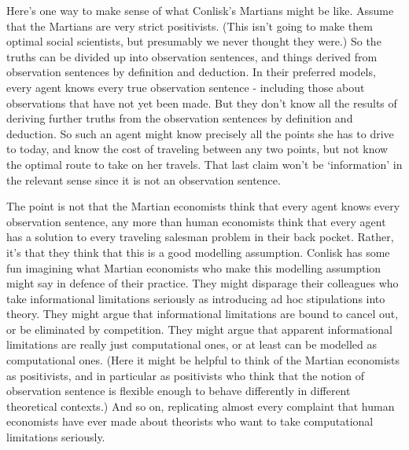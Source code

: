 \documentclass[
  10pt,
  letterpaper,
  twoside]{scrbook}
\begin{document}
Here's one way to make sense of what Conlisk's Martians might be like.
Assume that the Martians are very strict positivists. (This isn't going
to make them optimal social scientists, but presumably we never thought
they were.) So the truths can be divided up into observation sentences,
and things derived from observation sentences by definition and
deduction. In their preferred models, every agent knows every true
observation sentence - including those about observations that have not
yet been made. But they don't know all the results of deriving further
truths from the observation sentences by definition and deduction. So
such an agent might know precisely all the points she has to drive to
today, and know the cost of traveling between any two points, but not
know the optimal route to take on her travels. That last claim won't be
`information' in the relevant sense since it is not an observation
sentence.

The point is not that the Martian economists think that every agent
knows every observation sentence, any more than human economists think
that every agent has a solution to every traveling salesman problem in
their back pocket. Rather, it's that they think that this is a good
modelling assumption. Conlisk has some fun imagining what Martian
economists who make this modelling assumption might say in defence of
their practice. They might disparage their colleagues who take
informational limitations seriously as introducing ad hoc stipulations
into theory. They might argue that informational limitations are bound
to cancel out, or be eliminated by competition. They might argue that
apparent informational limitations are really just computational ones,
or at least can be modelled as computational ones. (Here it might be
helpful to think of the Martian economists as positivists, and in
particular as positivists who think that the notion of observation
sentence is flexible enough to behave differently in different
theoretical contexts.) And so on, replicating almost every complaint
that human economists have ever made about theorists who want to take
computational limitations seriously.
\end{document}
